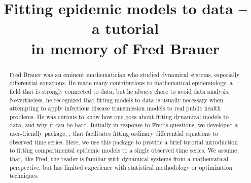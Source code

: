 \documentclass[]{interact}\usepackage[]{graphicx}\usepackage[]{xcolor}
\theoremstyle{plain}%
\theoremstyle{definition}
\theoremstyle{remark}
\newcommand{\code}[1]{\texttt{\detokenize{#1}}}
\begin{document}

\title{Fitting epidemic models to data -- a tutorial\\in memory of Fred
  Brauer}

\author{
  \name{David J.\,D.~Earn\textsuperscript{a}\thanks{%
    D.J.D.~Earn. \href{mailto:earn@math.mcmaster.ca}{earn@math.mcmaster.ca}. ORCID: 0000-0002-7562-1341}, %
    Sang Woo Park\textsuperscript{b}\thanks{S.W.~Park. \href{mailto:swp2@princeton.edu}{swp2@princeton.edu}. ORCID 0000-0003-2202-3361,} %
    and Benjamin M.~Bolker\textsuperscript{a,c}\thanks{B.M.~Bolker. \href{mailto:bolkerb@mcmaster.ca}{bolkerb@mcmaster.ca}. ORCID: 0000-0002-2127-0443}, %
  }
}

\maketitle

\linenumbers

\bigskip \bigskip

\begin{abstract}
  Fred Brauer was an eminent mathematician who studied dynamical
  systems, especially differential equations.  He made many
  contributions to mathematical epidemiology, a field that is strongly
  connected to data, but he always chose to avoid data analysis.
  Nevertheless, he recognized that fitting models to data is usually
  necessary when attempting to apply infectious disease transmission
  models to real public health problems.  He was curious to know how
  one goes about fitting dynamical models to data, and why it can be
  hard.  Initially in response to Fred's questions, we developed a
  user-friendly \code{R} package, \code{fitode}, that facilitates
  fitting ordinary differential equations to observed time series.
  Here, we use this package to provide a brief tutorial introduction
  to fitting compartmental epidemic models to a single observed time
  series.  We assume that, like Fred, the reader is familiar with
  dynamical systems from a mathematical perspective, but has limited
  experience with statistical methodology or optimization techniques.
\end{abstract}
\end{document}
